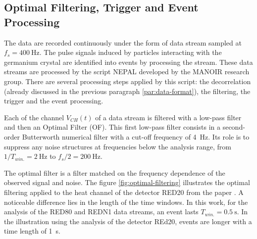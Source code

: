 \subsection{Optimal Filtering, Trigger and Event Processing}
\label{par:optimal-filtering}


The data are recorded continuously under the form of data stream sampled at $f_s=\SI{400}{\Hz}$. The pulse signals induced by particles interacting with the germanium crystal are identified into events by processing the stream. These data streams are processed by the script NEPAL developed by the MANOIR research group. There are several processing steps applied by this script: the decorrelation (already discussed in the previous paragraph \ref{par:data-format}), the filtering, the trigger and the event processing. 

Each of the channel $V_{CH}(t)$ of a data stream is filtered with a low-pass filter and then an Optimal Filter (OF). This first low-pass filter consists in a second-order Butterworth numerical filter with a cut-off frequency of \SI{4}{\Hz}. Its role is to suppress any noise structures at frequencies below the analysis range, from $1/T_{win.}=\SI{2}{\Hz}$ to $f_s/2=\SI{200}{\Hz}$. 

The optimal filter is a filter matched on the frequency dependence of the observed signal and noise. The figure \ref{fig:optimal-filtering} illustrates the optimal filtering applied to the heat channel of the detector RED20 from the paper \cite{Armengaud:2019kfj}. A noticeable difference lies in the length of the time windows. In this work, for the analysis of the RED80 and REDN1 data streams, an event lasts $T_{win.} = \SI{0.5}{\s}$. In the illustration using the analysis of the detector REd20, events are longer with a time length of \SI{1}{\s}.

